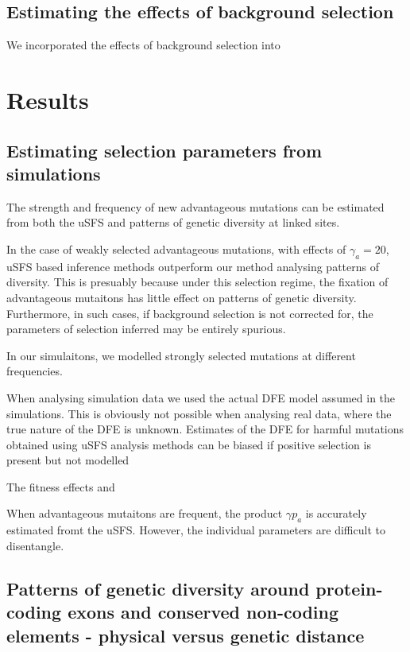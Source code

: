 \documentclass[11pt]{article}
\begin{document}
\subsection*{Estimating the effects of background selection}

We incorporated the effects of background selection into 

\section*{Results}
\subsection*{Estimating selection parameters from simulations}

	The strength and frequency of new advantageous mutations can be  estimated from both the uSFS and patterns of genetic diversity at linked sites. 
	
	In the case of weakly selected advantageous mutations, with effects of $\gamma_a = 20$, uSFS based inference methods outperform our method analysing patterns of diversity. This is presuably because under this selection regime, the fixation of advantageous mutaitons has little effect on patterns of genetic diversity. Furthermore, in such cases, if background selection is not corrected for, the parameters of selection inferred may be entirely spurious.
	
	In our simulaitons, we modelled strongly selected mutations at different frequencies. 
	
	When analysing simulation data we used the actual DFE model assumed in the simulations. This is obviously not possible when analysing real data, where the true nature of the DFE is unknown. Estimates of the DFE for harmful mutations obtained using uSFS analysis methods can be biased if positive selection is present but not modelled 
	
The fitness effects and 

When advantageous mutaitons are frequent, the product $\gamma p_a$ is accurately estimated fromt the uSFS. However, the individual parameters are difficult to disentangle. 
	

\subsection*{Patterns of genetic diversity around protein-coding exons and conserved non-coding elements - physical versus genetic distance}
\end{document}

